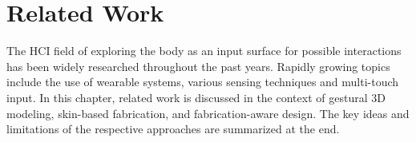 
%
%


\sectionfix
\section{Related Work}
\label{sec:relatedwork}
The HCI field of exploring the body as an input surface for possible interactions has been widely researched throughout the past years. Rapidly growing topics include the use of wearable systems, various sensing techniques and multi-touch input.\newpara
In this chapter, related work is discussed in the context of gestural 3D modeling, skin-based fabrication, and fabrication-aware design. The key ideas and limitations of the respective approaches are summarized at the end.
